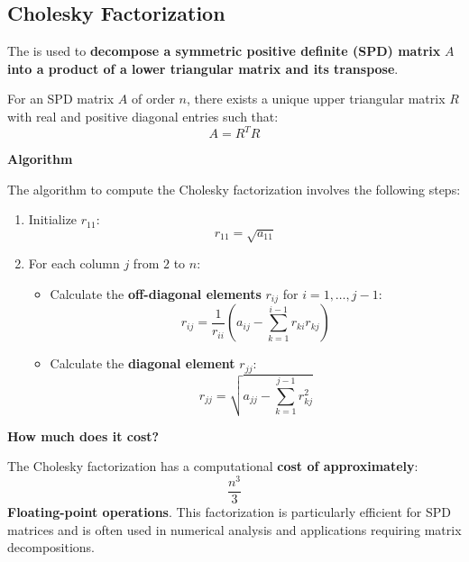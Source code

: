 \subsection{Cholesky Factorization}

The  is used to \textbf{decompose a symmetric positive definite (SPD) matrix} $A$ \textbf{into a product of a lower triangular matrix and its transpose}.

\highspace
\begin{definitionbox}
    For an SPD matrix $A$ of order $n$, there exists a unique upper triangular matrix $R$ with real and positive diagonal entries such that:
    \begin{equation*}
        A = R^{T} R
    \end{equation*}
\end{definitionbox}

\highspace
\begin{flushleft}
    \textcolor{Green3}{ \textbf{Algorithm}}
\end{flushleft}
The algorithm to compute the Cholesky factorization involves the following steps:
\begin{enumerate}
    \item Initialize $r_{11}$:
    \begin{equation*}
        r_{11} = \sqrt{a_{11}}
    \end{equation*}

    \item For each column $j$ from $2$ to $n$:
    \begin{itemize}
        \item Calculate the \textbf{off-diagonal elements} $r_{ij}$ for $i = 1, \ldots, j-1$:
        \[ r_{ij} = \frac{1}{r_{ii}} \left( a_{ij} - \sum_{k=1}^{i-1} r_{ki} r_{kj} \right) \]

        \item Calculate the \textbf{diagonal element} $r_{jj}$:
        \[ r_{jj} = \sqrt{a_{jj} - \sum_{k=1}^{j-1} r_{kj}^2} \]
    \end{itemize}
\end{enumerate}

\highspace
\begin{flushleft}
    \textcolor{Red2}{ \textbf{How much does it cost?}}
\end{flushleft}
The Cholesky factorization has a computational \textbf{cost of approximately}:
\begin{equation*}
    \dfrac{n^{3}}{3}
\end{equation*}
\textbf{Floating-point operations}. This factorization is particularly efficient for SPD matrices and is often used in numerical analysis and applications requiring matrix decompositions.
